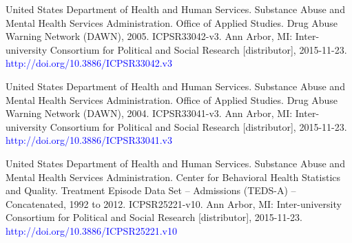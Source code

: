 \documentclass[a4 paper]{article}
\begin{document}
\begin{thebibliography}{1}
	 United States Department of Health and Human Services. Substance Abuse and Mental Health Services Administration. Office of Applied Studies. Drug Abuse Warning Network (DAWN), 2005. ICPSR33042-v3. Ann Arbor, MI: Inter-university Consortium for Political and Social Research [distributor], 2015-11-23. \textcolor{blue}{http://doi.org/10.3886/ICPSR33042.v3}
	
	 United States Department of Health and Human Services. Substance Abuse and Mental Health Services Administration. Office of Applied Studies. Drug Abuse Warning Network (DAWN), 2004. ICPSR33041-v3. Ann Arbor, MI: Inter-university Consortium for Political and Social Research [distributor], 2015-11-23. \textcolor{blue}{http://doi.org/10.3886/ICPSR33041.v3}
	
	
	 United States Department of Health and Human Services. Substance Abuse and Mental Health Services Administration. Center for Behavioral Health Statistics and Quality. Treatment Episode Data Set -- Admissions (TEDS-A) -- Concatenated, 1992 to 2012. ICPSR25221-v10. Ann Arbor, MI: Inter-university Consortium for Political and Social Research [distributor], 2015-11-23. \textcolor{blue}{http://doi.org/10.3886/ICPSR25221.v10}
	
\end{thebibliography}
\end{document}
